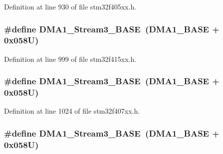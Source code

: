 Definition at line 930 of file stm32f405xx.\+h.

\subsubsection[{\texorpdfstring{D\+M\+A1\+\_\+\+Stream3\+\_\+\+B\+A\+SE}{DMA1_Stream3_BASE}}]{\setlength{\rightskip}{0pt plus 5cm}\#define D\+M\+A1\+\_\+\+Stream3\+\_\+\+B\+A\+SE~({\bf D\+M\+A1\+\_\+\+B\+A\+SE} + 0x058\+U)}\hypertarget{group___peripheral__registers__structures_gac51deb54ff7cfe1290dfcf517ae67127}{}\label{group___peripheral__registers__structures_gac51deb54ff7cfe1290dfcf517ae67127}


Definition at line 999 of file stm32f415xx.\+h.

\subsubsection[{\texorpdfstring{D\+M\+A1\+\_\+\+Stream3\+\_\+\+B\+A\+SE}{DMA1_Stream3_BASE}}]{\setlength{\rightskip}{0pt plus 5cm}\#define D\+M\+A1\+\_\+\+Stream3\+\_\+\+B\+A\+SE~({\bf D\+M\+A1\+\_\+\+B\+A\+SE} + 0x058\+U)}\hypertarget{group___peripheral__registers__structures_gac51deb54ff7cfe1290dfcf517ae67127}{}\label{group___peripheral__registers__structures_gac51deb54ff7cfe1290dfcf517ae67127}


Definition at line 1024 of file stm32f407xx.\+h.

\subsubsection[{\texorpdfstring{D\+M\+A1\+\_\+\+Stream3\+\_\+\+B\+A\+SE}{DMA1_Stream3_BASE}}]{\setlength{\rightskip}{0pt plus 5cm}\#define D\+M\+A1\+\_\+\+Stream3\+\_\+\+B\+A\+SE~({\bf D\+M\+A1\+\_\+\+B\+A\+SE} + 0x058\+U)}\hypertarget{group___peripheral__registers__structures_gac51deb54ff7cfe1290dfcf517ae67127}{}\label{group___peripheral__registers__structures_gac51deb54ff7cfe1290dfcf517ae67127}


